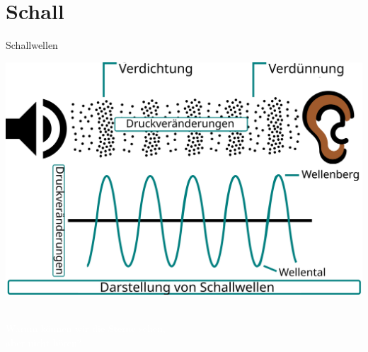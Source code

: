 \documentclass{beamer}
\begin{document}
\section{Schall}

\begin{frame}{Schallwellen}

\begin{center}
    \includegraphics[width=\textwidth]{Schallwelle.png}
\end{center}
\end{frame}


{

\begin{frame}[plain]

$\,$\\[8cm]

\textcolor{white}{Warum können wir die Sterne sehen, \\ aber nicht hören?} 

\end{frame}
}
\end{document}
